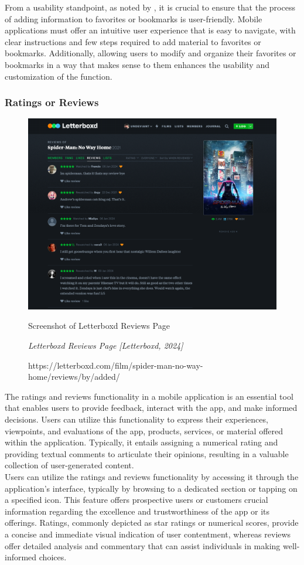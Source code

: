 From a usability standpoint, as noted by \textcite{weichbroth20}, it is crucial to ensure that the process of adding information to favorites or bookmarks is user-friendly. Mobile applications must offer an intuitive user experience that is easy to navigate, with clear instructions and few steps required to add material to favorites or bookmarks. Additionally, allowing users to modify and organize their favorites or bookmarks in a way that makes sense to them enhances the usability and customization of the function. \pagebreak

\subsubsection{Ratings or Reviews}
\begin{figure}[h]
    \centering
    \includegraphics[width=0.8\linewidth]{mainmatter/images/ratingsreviews.png}
    \caption{Screenshot of Letterboxd Reviews Page}
    \caption*{\textit{Letterboxd Reviews Page [Letterboxd, 2024]}}
    \caption*{https://letterboxd.com/film/spider-man-no-way-home/reviews/by/added/}
    \label{fig:myfig13}
\end{figure}
The ratings and reviews functionality in a mobile application is an essential tool that enables users to provide feedback, interact with the app, and make informed decisions. Users can utilize this functionality to express their experiences, viewpoints, and evaluations of the app, products, services, or material offered within the application. Typically, it entails assigning a numerical rating and providing textual comments to articulate their opinions, resulting in a valuable collection of user-generated content. \\

Users can utilize the ratings and reviews functionality by accessing it through the application's interface, typically by browsing to a dedicated section or tapping on a specified icon. This feature offers prospective users or customers crucial information regarding the excellence and trustworthiness of the app or its offerings. Ratings, commonly depicted as star ratings or numerical scores, provide a concise and immediate visual indication of user contentment, whereas reviews offer detailed analysis and commentary that can assist individuals in making well-informed choices. \\

